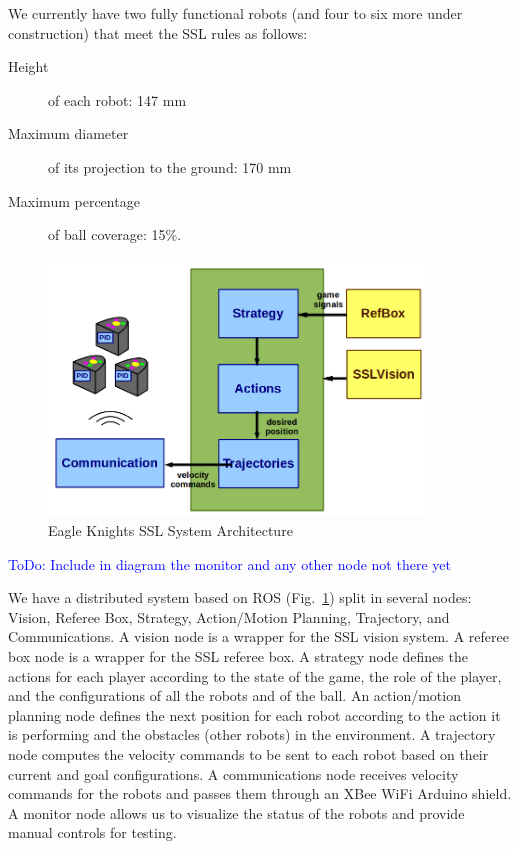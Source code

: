 \documentclass[]{llncs}
\newcommand{\TODO}[1]{{\textcolor{blue}{ToDo: {#1}}}}
\begin{document}
We currently have two fully functional robots (and four to six more under construction) that meet the SSL rules as follows:
\begin{description} 
	\item [Height] of each robot: 147 mm
	\item [Maximum diameter] of its projection to the ground: 170 mm
	\item [Maximum percentage] of ball coverage: 15\%. 
\end{description}


\begin{figure}[htb]
	\centering
	\includegraphics[width=10cm]{./pictures/eagle_knights_architecture.png}
	\caption{Eagle Knights SSL System Architecture}
	\label{fig:eagle-knights-architecture}  
\end{figure}

\TODO{Include in diagram the monitor and any other node not there yet}

We have a distributed system based on ROS (Fig.~\ref{fig:eagle-knights-architecture}) split in several nodes: Vision, Referee Box, Strategy, Action/Motion Planning, Trajectory, and Communications. A vision node is a wrapper for the SSL vision system. A referee box node is a wrapper for the SSL referee box. A strategy node defines the actions for each player  according to the state of the game, the role of the player, and the configurations of all the robots and of the ball. An action/motion planning node defines the next position for each robot according to the action it is performing and the obstacles (other robots) in the environment. A trajectory node computes the velocity commands to be sent to each robot based on their current and goal configurations. A communications node receives velocity commands for the robots and passes them through an XBee WiFi Arduino shield. A monitor node allows us to visualize the status of the robots and provide manual controls for testing.
\end{document}

